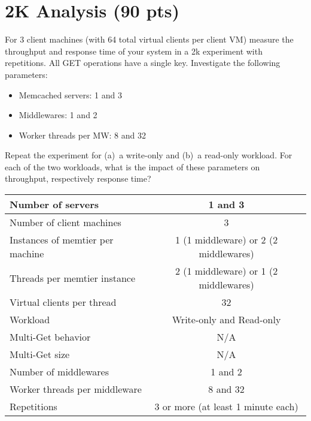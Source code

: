 \documentclass[report.tex]{subfiles}
\begin{document}
\section{2K Analysis (90 pts)}

For 3 client machines (with 64 total virtual clients per client VM) measure the throughput and response time of your system in a 2k experiment with repetitions. All GET operations have a single key. Investigate the following parameters:

\begin{itemize}
		
	\item Memcached servers: 1 and 3
	\item Middlewares: 1 and 2
	\item Worker threads per MW: 8 and 32
	      	      
\end{itemize}

Repeat the experiment for (a)~a write-only and (b)~a read-only workload.
For each of the two workloads, what is the impact of these parameters on throughput, respectively response time?

\begin{center}
	\scriptsize{
		\begin{tabular}{|l|c|}
			\hline Number of servers                & 1 and 3                                     \\ 
			\hline Number of client machines        & 3                                           \\ 
			\hline Instances of memtier per machine & 1 (1 middleware) or 2 (2 middlewares) \\ 
			\hline Threads per memtier instance     & 2 (1 middleware) or 1 (2 middlewares)   \\
			\hline Virtual clients per thread       &  32                                     \\ 
			\hline Workload                         & Write-only and Read-only\\
			\hline Multi-Get behavior               & N/A                                         \\
			\hline Multi-Get size                   & N/A                                         \\
			\hline Number of middlewares            & 1 and 2                                     \\
			\hline Worker threads per middleware    & 8 and 32                                    \\
			\hline Repetitions                      & 3 or more (at least 1 minute each)                                   \\ 
			\hline 
		\end{tabular}
	} 
\end{center}
\end{document}
